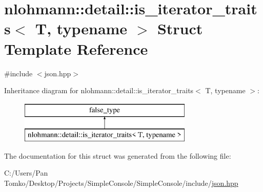 \hypertarget{structnlohmann_1_1detail_1_1is__iterator__traits}{}\section{nlohmann\+::detail\+::is\+\_\+iterator\+\_\+traits$<$ T, typename $>$ Struct Template Reference}
\label{structnlohmann_1_1detail_1_1is__iterator__traits}


{\ttfamily \#include $<$json.\+hpp$>$}

Inheritance diagram for nlohmann\+::detail\+::is\+\_\+iterator\+\_\+traits$<$ T, typename $>$\+:\begin{figure}[H]
\begin{center}
\leavevmode
\includegraphics[height=2.000000cm]{d3/d30/structnlohmann_1_1detail_1_1is__iterator__traits}
\end{center}
\end{figure}


The documentation for this struct was generated from the following file\+:\begin{DoxyCompactItemize}
\item 
C\+:/\+Users/\+Pan Tomko/\+Desktop/\+Projects/\+Simple\+Console/\+Simple\+Console/include/\mbox{\hyperlink{json_8hpp}{json.\+hpp}}\end{DoxyCompactItemize}
